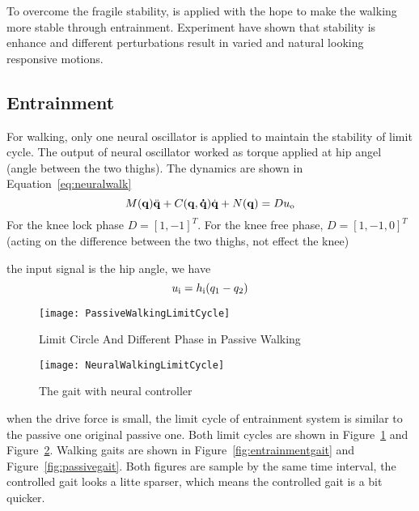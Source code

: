 To overcome the fragile stability, \cpg is applied with the hope to make the walking more stable through entrainment.
Experiment have shown that stability is enhance and different perturbations result in varied and natural looking responsive motions.




\subsection{Entrainment}
For walking, only one neural oscillator is applied to maintain the stability of limit cycle.
The output of neural oscillator worked as torque applied at hip angel (angle between the two thighs).
The dynamics are shown in Equation~\ref{eq:neuralwalk}
\begin{equation}
\label{eq:neuralwalk}
M(\mathbf{q}) \ddot{\mathbf{q}} + C(\mathbf{q,\dot{q}})\dot{\mathbf{q}} + N(\mathbf{q}) = Du_{\mathrm{o}}
\end{equation}
For the knee lock phase $D=[1,-1]^T$.
For the knee free phase, $D=[1,-1,0]^T$(acting on the difference between the two thighs, not effect the knee)

the input signal is the hip angle,
we have 
\[
	u_{\mathrm{i}}=h_{\mathrm{i}}(q_1-q_2)
\]





\begin{figure}[!htbp]
  \begin{center}
    \texttt{[image: PassiveWalkingLimitCycle]}
    \caption{Limit Circle And Different Phase in Passive Walking}
    \label{fig:passivegaitlimitcycle}
\end{center}
\end{figure}


\begin{figure}[!htbp]
  \begin{center}
      \texttt{[image: NeuralWalkingLimitCycle]}
    \caption{The gait with neural controller}
    \label{fig:entrainmentgaitlimitcyle}
\end{center}
\end{figure}
when the drive force is small, the limit cycle of entrainment system is similar to the passive one original passive one.
Both limit cycles are shown in Figure~\ref{fig:passivegaitlimitcycle} and Figure~\ref{fig:entrainmentgaitlimitcyle}.
Walking gaits are shown in Figure~\ref{fig:entrainmentgait} and Figure~\ref{fig:passivegait}.
Both figures are sample by the same time interval, the controlled gait looks a litte sparser, which means the controlled gait is a bit quicker. 





